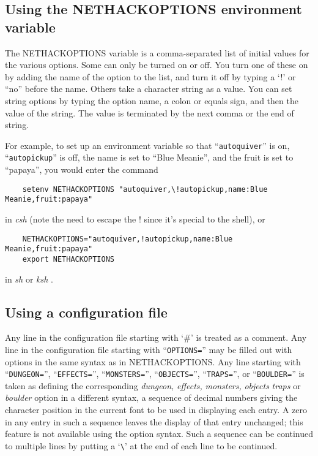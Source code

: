 \subsection*{Using the NETHACKOPTIONS environment variable}

The NETHACKOPTIONS variable is a comma-separated list of initial
values for the various options.  Some can only be turned on or off.
You turn one of these on by adding the name of the option to the list,
and turn it off by typing a `!' or ``no'' before the name.  Others take a 
character string as a value.  You can set string options by typing
the option name, a colon or equals sign, and then the value of the string.
The value is terminated by the next comma or the end of string.

For example, to set up an environment variable so that ``{\tt autoquiver}'' is on,
``{\tt autopickup}'' is off, the name is set to ``Blue Meanie'', and the fruit
is set to ``papaya'', you would enter the command
\begin{verbatim}
    setenv NETHACKOPTIONS "autoquiver,\!autopickup,name:Blue Meanie,fruit:papaya"
\end{verbatim}
\nd in %
{\it csh}
(note the need to escape the ! since it's special to the shell), or
\begin{verbatim}
    NETHACKOPTIONS="autoquiver,!autopickup,name:Blue Meanie,fruit:papaya"
    export NETHACKOPTIONS
\end{verbatim}
\nd in %
{\it sh}
or %
{\it  ksh}%
.
\subsection*{Using a configuration file}

Any line in the configuration file starting with `\#' is treated as a comment.
Any line in the configuration file starting with ``{\tt OPTIONS=}'' may be
filled out with options in the same syntax as in NETHACKOPTIONS.
Any line starting with ``{\tt DUNGEON=}'', ``{\tt EFFECTS=}'',
``{\tt MONSTERS=}'', ``{\tt OBJECTS=}'', ``{\tt TRAPS=}'', or ``{\tt BOULDER=}''
is taken as defining the corresponding
{\it dungeon, }
{\it effects, }
{\it monsters, }
{\it objects }
{\it traps }
or
{\it boulder }
option in a different syntax,
a sequence of decimal numbers giving the character position
in the current font to be used in displaying each entry.
A zero in any entry in such a sequence leaves the display of that
entry unchanged; this feature is not available using the option syntax.
Such a sequence can be continued to multiple lines by putting a
`{\tt \verb+\+}' at the end of each line to be continued.

